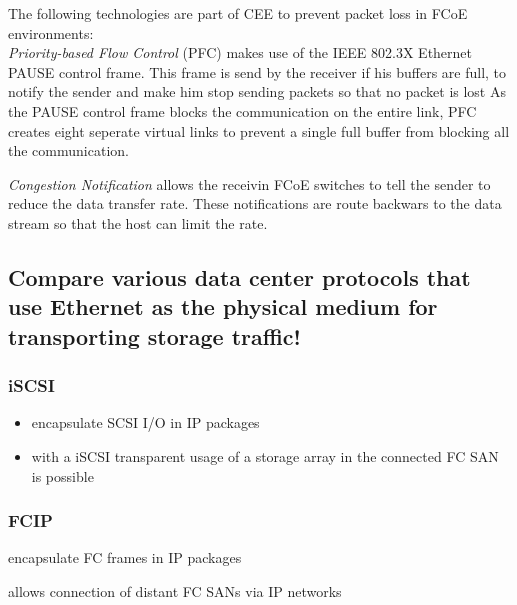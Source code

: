 	The following technologies are part of CEE to prevent packet loss in FCoE environments:\\
	\emph{Priority-based Flow Control} (PFC) makes use of the IEEE 802.3X Ethernet PAUSE control frame.
	This frame is send by the receiver if his buffers are full,
	to notify the sender and make him stop sending packets
	so that no packet is lost
	As the PAUSE control frame blocks the communication on the entire link,
	PFC creates eight seperate virtual links to prevent a single full buffer from blocking
	all the communication.

	\emph{Congestion Notification} allows the receivin FCoE switches to tell the sender to
	reduce the data transfer rate.
	These notifications are route backwars to the data stream so that the host can limit the rate.

\subsection{Compare various data center protocols that use Ethernet as the physical medium for transporting storage traffic!} %
\label{sub:compare_various_data_center_protocols_that_use_ethernet_as_the_physical_medium_for_transporting_storage_traffic}
	\subsubsection{iSCSI} %
	\label{ssub:iscsi}
		\begin{itemize}
			\item encapsulate SCSI I/O in IP packages
			\item with a iSCSI transparent usage of a storage array in the connected FC SAN is possible
		\end{itemize}
	\subsubsection{FCIP} %
	\label{ssub:fcip}
		\begin{imtemize}
			\item encapsulate FC frames in IP packages
			\item allows connection of distant FC SANs via IP networks
		\end{imtemize}
